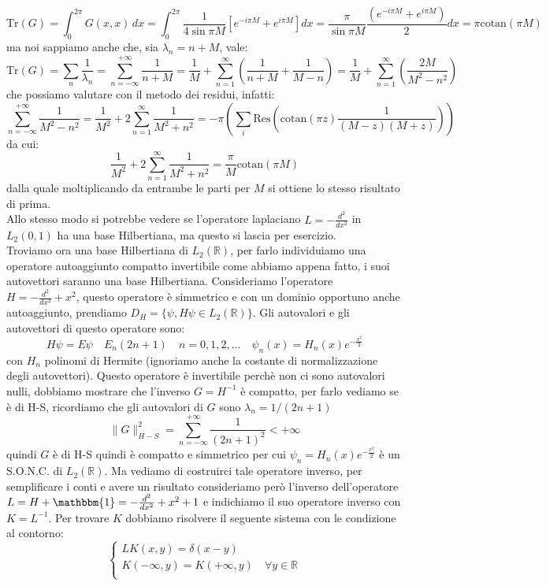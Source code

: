 \documentclass[12pt]{book}
\theoremstyle{plain}
\newcommand{\R}{\mathbb{R}}
\theoremstyle{definition}
\theoremstyle{remark}
\begin{document}
\[\text{Tr}(G) = \int_0^{2\pi} G(x,x)\,dx = \int_0^{2\pi}\frac{1}{4\sin \pi M}[e^{-i\pi M} + e^{i\pi M}]dx  = \frac{\pi}{\sin \pi M}\frac{(e^{-i\pi M} + e^{i\pi M})}{2}dx = \pi \text{cotan}(\pi M)\]
ma noi sappiamo anche che, sia $\lambda_n = n+ M$, vale:
\[\text{Tr}(G) = \sum_n \frac{1}{\lambda_n} = \sum_{n=-\infty}^{+\infty} \frac{1}{n+M} = \frac{1}{M} + \sum_{n=1}^\infty\left(\frac{1}{n+M} + \frac{1}{M-n}\right) = \frac{1}{M} + \sum_{n=1}^\infty\left(\frac{2M}{M^2-n^2}\right)\]
che possiamo valutare con il metodo dei residui, infatti:
\[\sum_{n = -\infty}^{+\infty}\frac{1}{M^2-n^2} = \frac{1}{M^2} + 2\sum_{n=1}^\infty \frac{1}{M^2+n^2} = -\pi\left(\sum_i\text{Res}\left(\text{cotan}(\pi z) \frac{1}{(M-z)(M+z)}\right)\right)\]
da cui:
\[\frac{1}{M^2} + 2\sum_{n=1}^\infty \frac{1}{M^2+n^2} = \frac{\pi}{M} \text{cotan}(\pi M)\]
dalla quale moltiplicando da entrambe le parti per $M$ si ottiene lo stesso risultato di prima.\\
Allo stesso modo si potrebbe vedere se l'operatore laplaciano $L=-\frac{d^2}{dx^2}$ in $L_2(0,1)$ ha una base Hilbertiana, ma questo si lascia per esercizio.\\
Troviamo ora una base Hilbertiana di $L_2(\R)$, per farlo individuiamo una operatore autoaggiunto compatto invertibile come abbiamo appena fatto, i suoi autovettori saranno una base Hilbertiana. Consideriamo l'operatore  $H = -\frac{d^2}{dx^2} +x^2$, questo operatore è simmetrico e con un dominio opportuno anche autoaggiunto, prendiamo $D_{H} = \{\psi,H\psi\in L_2(\R)\}$. Gli autovalori e gli autovettori di questo operatore sono:
\[H\psi = E \psi \quad E_n(2n+1)\quad n=0,1,2,\dots \quad \psi_n(x) = H_n(x)e^{-\frac{x^2}{2}}\]
con $H_n$ polinomi di Hermite (ignoriamo anche la costante di normalizzazione degli autovettori). Questo operatore è invertibile perchè non ci sono autovalori nulli, dobbiamo mostrare che l'inverso $G = H^{-1}$ è compatto, per farlo vediamo se è di H-S, ricordiamo che gli autovalori di $G$ sono $\lambda_n = 1/(2n+1)$
\[\|G\|^2_{H-S} = \sum_{n=-\infty}^{+\infty} \frac{1}{(2n+1)^2} <+\infty\]
quindi $G$ è di H-S quindi è compatto e simmetrico per cui $\psi_n = H_n(x)e^{-\frac{x^2}{2}}$ è un S.O.N.C. di $L_2(\R)$. Ma vediamo di costruirci tale operatore inverso, per semplificare i conti e avere un risultato consideriamo però l'inverso dell'operatore $L=H+\mathbbm{1} = -\frac{d^2}{dx^2} +x^2+1$ e indichiamo il suo operatore inverso con $K=L^{-1}$. Per trovare $K$ dobbiamo risolvere il seguente sistema con le condizione al contorno:
\[\begin{cases}
    LK(x,y) = \delta(x-y)\\
    K(-\infty,y) = K(+\infty,y) \quad \forall y\in\R\\
  \end{cases}\]
\end{document}
